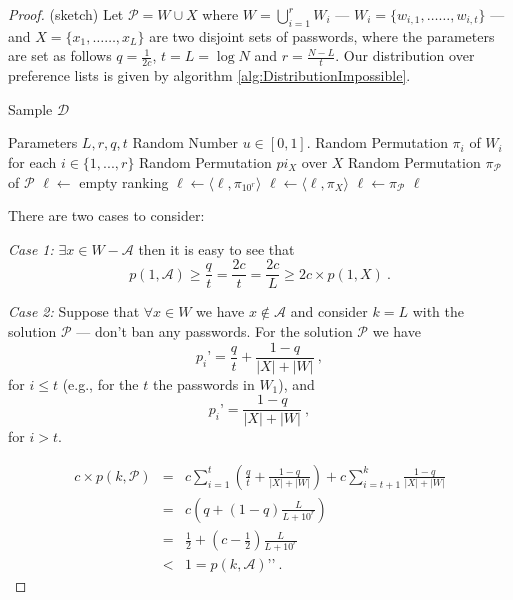 \documentclass[prodmode,acmec]{ec-acmsmall}
\newcommand{\PasswordSpace}{\mathcal{P}}
\begin{document}
\begin{proof}(sketch) 
Let $\PasswordSpace = W \cup X$ where $W= \bigcup_{i=1}^{r} W_i$ --- $W_i = \{w_{i,1},\ldots,w_{i,t}\}$ --- and $X= \{x_1,\ldots,x_{L}\}$ are two disjoint sets of passwords, where the parameters are set as follows
$q = \frac{1}{2c}$, $t=L = \log N$ and $r = \frac{N-L}{t}$.
 Our distribution over preference lists is given by algorithm \ref{alg:DistributionImpossible}.


\begin{algorithm}
\caption{Sample $\mathcal{D}$}
\begin{algorithmic}
\State Parameters $L, r, q, t$
\State Random Number  $u \in [0,1]$. 
\State Random Permutation $\pi_i$ of $W_i$ for each $i \in \{1,...,r\}$
\State Random Permutation $pi_X$ over $X$
\State Random Permutation $\pi_\PasswordSpace$ of $\PasswordSpace$ 
 $\ell \gets$ empty ranking
 \State $\ell \gets \langle\ell,\pi_{10^r}\rangle$
 \EndFor
 \State $\ell \gets \langle \ell , \pi_X \rangle$
\Else
{}
\State $\ell \gets \pi_\PasswordSpace$
\EndIf
\Return $\ell$
\end{algorithmic}
\label{alg:DistributionImpossible}
\end{algorithm}

There are two cases to consider:

{\em Case 1:} $\exists x \in W-\mathcal{A}$ then it is easy to see that 
\[ p\left(1,\mathcal{A}\right) \geq \frac{q}{t} = \frac{2c}{t} = \frac{2c}{L} \geq 2c \times p\left(1,X\right)   \ . \]

{\em Case 2:} Suppose that $\forall x \in W$ we have $x \notin \mathcal{A}$ and consider $k=L$ with the solution $\PasswordSpace$ --- don't ban any passwords. For the solution $\PasswordSpace$ we have \[ p_i = \frac{q}{t}+\frac{1-q}{\left|X\right|+\left|W\right|} \ ,\] for $i \leq t$ (e.g., for the $t$ the passwords in $W_1$), and \[p_i = \frac{1-q}{\left|X\right|+\left|W\right|} \ , \]
for $i >  t$.

\begin{eqnarray*}
c \times p\left(k,\PasswordSpace\right) &=&c\sum_{i=1}^t \left(\frac{q}{t} + \frac{1-q}{|X|+|W|} \right) + c\sum_{i=t+1}^k \frac{1-q}{|X|+|W|}  \\
&=& c\left(q+\left(1-q\right)\frac{L}{L+10^r} \right) \\
&=& \frac{1}{2} + \left(c-\frac{1}{2}\right)\frac{L}{L+10^r} \\
&<& 1 =  p\left(k,\mathcal{A}\right) \ .
\end{eqnarray*}
\end{proof}
\end{document}
